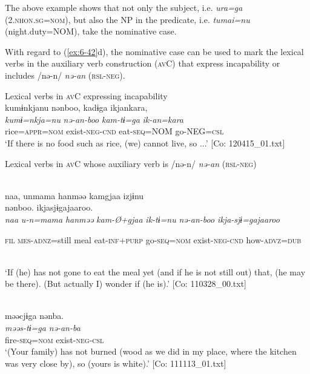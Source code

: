 \begin{table}
The above example shows that not only the subject, i.e. \textit{ura=ga} (2.\textsc{nhon}.\textsc{sg}=\textsc{nom}), but also the NP in the predicate, i.e. \textit{tumai=nu} (night.duty=NOM), take the nominative case.

  With regard to (\ref{ex:6-42}d), the nominative case can be used to mark the lexical verbs in the auxiliary verb construction (\textsc{av}C) that express incapability or includes /nə-n/ \textit{nə-an} (\textsc{rsl}-\textsc{neg}).

\ea\label{ex:6-48}
 Lexical verbs in \textsc{av}C expressing incapability\\

 \ea {\TM}  kumɨnkjanu  nənboo,  kadɨga  ikjankara,\\
\glll \textit{kumɨ=nkja=nu}  \textit{nə-an-boo}  \textit{kam-tɨ=ga}  \textit{ik-an=kara}\\
rice=\textsc{appr}=\textsc{nom}  exist-\textsc{neg}-\textsc{cnd}  eat-\textsc{seq}=NOM  go-NEG=\textsc{csl}\\
\glt ‘If there is no food such as rice, (we) cannot live, so ...’ [Co: 120415\_01.txt]
\z

  Lexical verbs in \textsc{av}C whose auxiliary verb is /nə-n/ \textit{nə-an} (\textsc{rsl}-\textsc{neg})

\ex{}\\
{\TM}
\glll  naa,  unmama  hanməə  kamgjaa  izjɨnu\\                                                                                        nənboo.  ikjasjɨgajaaroo.\\

      \textit{naa}  \textit{u-n=mama}  \textit{hanməə}  \textit{kam-Ø+gjaa}  \textit{ik-tɨ=nu}                                        \textit{nə-an-boo  ikja-sjɨ=gajaaroo}

      \textsc{fil}  \textsc{mes}-\textsc{adnz}=still  meal  eat-\textsc{inf}+\textsc{purp}  go-\textsc{seq}=\textsc{nom}              exist-\textsc{neg}-\textsc{cnd}  how-\textsc{advz}=\textsc{dub}





\\
\glt ‘If (he) has not gone to eat the meal yet (and if he is not still out) that, (he may be there). (But actually I) wonder if (he is).’ [Co: 110328\_00.txt]
\z

\ex{}\\
{\TM}
\glll  məəcjɨga  nənba.\\
\textit{məəs-tɨ=ga}  \textit{nə-an-ba}\\
fire-\textsc{seq}=\textsc{nom}  exist-\textsc{neg}-\textsc{csl}\\
\glt ‘(Your family) has not burned (wood as we did in my place, where the kitchen was very close by), so (yours is white).’ [Co: 111113\_01.txt]
\z


\end{table}
